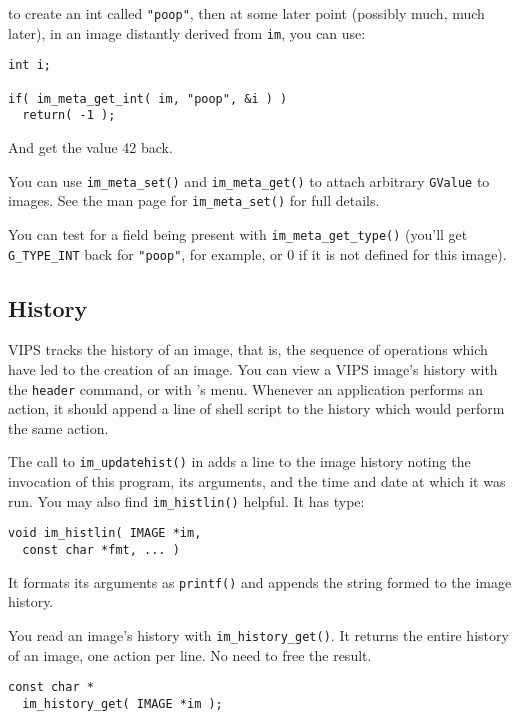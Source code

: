 \noindent
to create an int called \verb+"poop"+, then at some later point (possibly much,
much later), in an image distantly derived from \verb+im+, you can use:

\begin{verbatim}
int i;

if( im_meta_get_int( im, "poop", &i ) )
  return( -1 );
\end{verbatim}

\noindent
And get the value 42 back. 

You can use \verb+im_meta_set()+ and \verb+im_meta_get()+ to attach arbitrary
\verb+GValue+ to images. 
See the man page for \verb+im_meta_set()+ for full
details. 

You can test for a field being present with \verb+im_meta_get_type()+ (you'll
get \verb+G_TYPE_INT+ back for \verb+"poop"+, for example, or 0 if it is not
defined for this image).

\subsection{History}
\label{sec:history}

VIPS tracks the history of an image, that is, the sequence of operations which
have led to the creation of an image. You can view a VIPS image's history with
the \verb+header+ command, or with \nip{}'s  menu. Whenever an
application performs an action, it should append a line of shell script to the
history which would perform the same action.

The call to \verb+im_updatehist()+ in  adds a line to the
image history noting the invocation of this program, its arguments, and the
time and date at which it was run.  You may also find \verb+im_histlin()+
helpful. It has type:

\begin{verbatim}
void im_histlin( IMAGE *im, 
  const char *fmt, ... )
\end{verbatim}

\noindent
It formats its arguments as \verb+printf()+ and appends the string formed
to the image history.

You read an image's history with \verb+im_history_get()+. It returns the
entire history of an image, one action per line. No need to free the result.

\begin{verbatim}
const char *
  im_history_get( IMAGE *im ); 
\end{verbatim}

